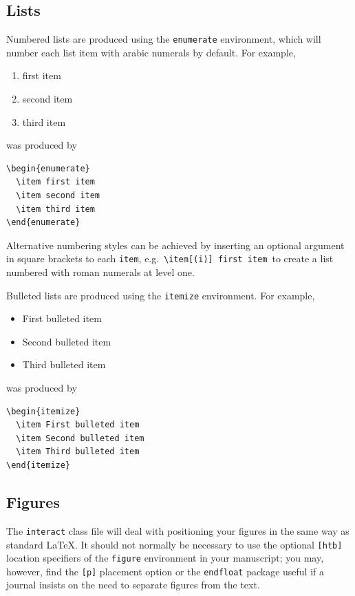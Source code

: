 \documentclass[]{interact}
\theoremstyle{plain}%
\theoremstyle{definition}
\theoremstyle{remark}
\begin{document}
\subsection{Lists}

Numbered lists are produced using the \texttt{enumerate} environment, which will number each list item with arabic numerals by default. For example,
\begin{enumerate}
  \item first item
  \item second item
  \item third item
\end{enumerate}
was produced by
\begin{verbatim}
\begin{enumerate}
  \item first item
  \item second item
  \item third item
\end{enumerate}
\end{verbatim}
Alternative numbering styles can be achieved by inserting an optional argument in square brackets to each \verb"item", e.g.\ \verb"\item[(i)] first item"\, to create a list numbered with roman numerals at level one.

Bulleted lists are produced using the \texttt{itemize} environment. For example,
\begin{itemize}
  \item First bulleted item
  \item Second bulleted item
  \item Third bulleted item
\end{itemize}
was produced by
\begin{verbatim}
\begin{itemize}
  \item First bulleted item
  \item Second bulleted item
  \item Third bulleted item
\end{itemize}
\end{verbatim}


\subsection{Figures}

The \texttt{interact} class file will deal with positioning your figures in the same way as standard \LaTeX. It should not normally be necessary to use the optional \texttt{[htb]} location specifiers of the \texttt{figure} environment in your manuscript; you may, however, find the \verb"[p]" placement option or the \verb"endfloat" package useful if a journal insists on the need to separate figures from the text.
\end{document}
